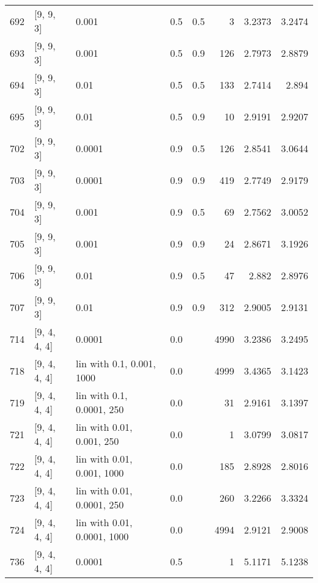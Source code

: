 \begin{longtable}{lllrrrrr}
  692 &          [9, 9, 3] &                       0.001 &      0.5 & 0.5 &    3 &   3.2373 &   3.2474 \\
  693 &          [9, 9, 3] &                       0.001 &      0.5 & 0.9 &  126 &   2.7973 &   2.8879 \\
  694 &          [9, 9, 3] &                        0.01 &      0.5 & 0.5 &  133 &   2.7414 &    2.894 \\
  695 &          [9, 9, 3] &                        0.01 &      0.5 & 0.9 &   10 &   2.9191 &   2.9207 \\
  702 &          [9, 9, 3] &                      0.0001 &      0.9 & 0.5 &  126 &   2.8541 &   3.0644 \\
  703 &          [9, 9, 3] &                      0.0001 &      0.9 & 0.9 &  419 &   2.7749 &   2.9179 \\
  704 &          [9, 9, 3] &                       0.001 &      0.9 & 0.5 &   69 &   2.7562 &   3.0052 \\
  705 &          [9, 9, 3] &                       0.001 &      0.9 & 0.9 &   24 &   2.8671 &   3.1926 \\
  706 &          [9, 9, 3] &                        0.01 &      0.9 & 0.5 &   47 &    2.882 &   2.8976 \\
  707 &          [9, 9, 3] &                        0.01 &      0.9 & 0.9 &  312 &   2.9005 &   2.9131 \\
  714 &       [9, 4, 4, 4] &                      0.0001 &      0.0 &     & 4990 &   3.2386 &   3.2495 \\
  718 &       [9, 4, 4, 4] &   lin with 0.1, 0.001, 1000 &      0.0 &     & 4999 &   3.4365 &   3.1423 \\
  719 &       [9, 4, 4, 4] &   lin with 0.1, 0.0001, 250 &      0.0 &     &   31 &   2.9161 &   3.1397 \\
  721 &       [9, 4, 4, 4] &   lin with 0.01, 0.001, 250 &      0.0 &     &    1 &   3.0799 &   3.0817 \\
  722 &       [9, 4, 4, 4] &  lin with 0.01, 0.001, 1000 &      0.0 &     &  185 &   2.8928 &   2.8016 \\
  723 &       [9, 4, 4, 4] &  lin with 0.01, 0.0001, 250 &      0.0 &     &  260 &   3.2266 &   3.3324 \\
  724 &       [9, 4, 4, 4] & lin with 0.01, 0.0001, 1000 &      0.0 &     & 4994 &   2.9121 &   2.9008 \\
  736 &       [9, 4, 4, 4] &                      0.0001 &      0.5 &     &    1 &   5.1171 &   5.1238 \\

\end{longtable}
